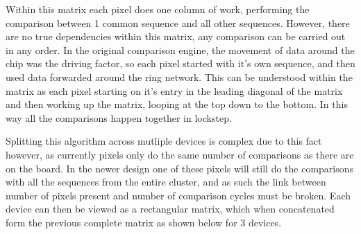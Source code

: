  
Within this matrix each pixel does one column of work, performing the comparison between 1 common sequence and all other sequences. However, there are no true dependencies within this matrix, any comparison can be carried out in any order. In the original comparison engine, the movement of data around the chip was the driving factor, so each pixel started with it's own sequence, and then used data forwarded around the ring network. This can be understood within the matrix as each pixel starting on it's entry in the leading diagonal of the matrix and then working up the matrix, looping at the top down to the bottom. In this way all the comparisons happen together in lockstep.

Splitting this algorithm across mutliple devices is complex due to this fact however, as currently pixels only do the same number of comparisons as there are on the board. In the newer design one of these pixels will still do the comparisons with all the sequences from the entire cluster, and as such the link between number of pixels present and  number of comparison cycles must be broken. Each device can then be viewed as a rectangular matrix, which when concatenated form the previous complete matrix as shown below for 3 devices.




